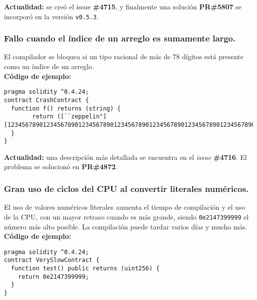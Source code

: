 \textbf{Actualidad:} se creó el issue \textbf{\#4715}\cite{GHI4715}, y finalmente una solución \textbf{PR\#5807}\cite{GHPR5807} se incorporó en la versión \texttt{v0.5.3}.\\

\subsubsection{Fallo cuando el índice de un arreglo es sumamente largo.}

El compilador se bloquea si un tipo racional de más de 78 dígitos está presente como un índice de un arreglo.\\

\textbf{Código de ejemplo:}
\begin{lstlisting}[language=Solidity]
pragma solidity ^0.4.24;
contract CrashContract {
  function f() returns (string) {
        return ([``zeppelin"][123456789012345678901234567890123456789012345678901234567890123456789012345678]);
  }
}
\end{lstlisting}

\textbf{Actualidad:} una descripción más detallada se encuentra en el \textit{issue} \textbf{\#4716}\cite{GHI4716}. El problema se solucionó en \textbf{PR\#4872}\cite{GHPR4872}.\\

\subsubsection{Gran uso de ciclos del CPU al convertir literales numéricos.}

El uso de valores numéricos literales aumenta el tiempo de compilación y el uso de la CPU, con un mayor retraso cuando es más grande, siendo \texttt{0e2147399999} el número más alto posible. La compilación puede tardar varios días y mucho más.\\

\textbf{Código de ejemplo:}
\begin{lstlisting}[language=Solidity]
pragma solidity ^0.4.24;                                                  
contract VerySlowContract {                                                                                                                                
  function test() public returns (uint256) {                                                                                                   
    return 0e2147399999;                                                                                                                       
  }                                                                                                                                            
}
\end{lstlisting}

